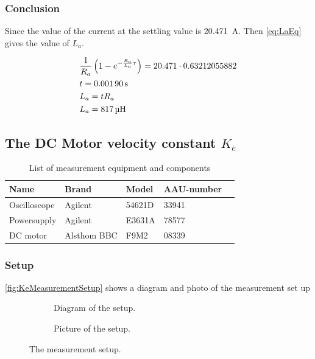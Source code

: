 \subsubsection*{Conclusion}

Since the value of the current at the settling value is \SI{20.471}{\ampere}. Then \autoref{eq:LaEq} gives the value of $L_a$.

\begin{subequations} \label{eq:LaEq}
	\begin{flalign}
		&\frac{1}{R_a} \left(1-e^{-\frac{R_a}{L_a} \tau}\right)=20.471 \cdot 0.63212055882 \addunit{\second} \\
		&t = \SI{0.00190}{\second} \\
		&L_a=tR_a \\
		&L_a=\SI{817}{\micro\henry}
	\end{flalign}
\end{subequations}


\subsection{The DC Motor velocity constant $K_e$}

\begin{table}[htbp]
	\centering
	\caption{List of measurement equipment and components}\label{tab_appendix:KeSetUp}
	
	\begin{tabularx}{\textwidth}{lXXXX}
		Name 				& Brand	& Model & AAU-number									\\ \toprule \rowcolor{lightGrey}
		Oscilloscope	& Agilent & 54621D & 33941 	\\
		Powersupply	& Agilent & E3631A & 78577\\ \rowcolor{lightGrey}
		DC motor & Alsthom BBC & F9M2& 08339
	\end{tabularx}
\end{table}

\subsubsection*{Setup}
\autoref{fig:KeMeasurementSetup} shows a diagram and photo of the measurement set up
\begin{figure}[htbp]
	\centering
	\begin{subfigure}{0.50\textwidth}
		\caption{Diagram of the setup.} \label{fig:KeMeasurementDiagram}
	\end{subfigure}
	\begin{subfigure}{0.40\textwidth}
		\caption{Picture of the setup.} \label{fig:KeMeasurementPictures}
	\end{subfigure}
	\caption{The measurement setup.} \label{fig:KeMeasurementSetup}   
\end{figure}


